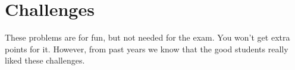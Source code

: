 \documentclass[assignments]{subfiles}
\begin{document}





\clearpage
\section{Challenges}
These problems are for fun, but not needed for the exam. You won't get extra points for it. However, from past years we know that the good students really liked these challenges.












% 
% 
\end{document}
